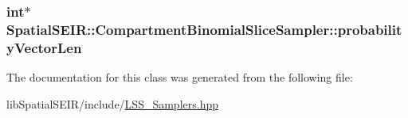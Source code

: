 \hypertarget{classSpatialSEIR_1_1CompartmentBinomialSliceSampler_aac982be0c3ae19b0a9960c0dbd1107ac}{
\subsubsection[{probability\-Vector\-Len}]{\setlength{\rightskip}{0pt plus 5cm}int$\ast$ Spatial\-S\-E\-I\-R\-::\-Compartment\-Binomial\-Slice\-Sampler\-::probability\-Vector\-Len}}\label{classSpatialSEIR_1_1CompartmentBinomialSliceSampler_aac982be0c3ae19b0a9960c0dbd1107ac}


The documentation for this class was generated from the following file\-:\begin{DoxyCompactItemize}
\item 
lib\-Spatial\-S\-E\-I\-R/include/\hyperlink{LSS__Samplers_8hpp}{L\-S\-S\-\_\-\-Samplers.\-hpp}\end{DoxyCompactItemize}
